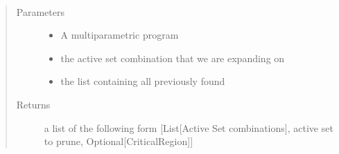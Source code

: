 \documentclass[letterpaper,10pt,english]{sphinxmanual}
\begin{document}
\begin{fulllineitems}
\label{\detokenize{ppopt.mp_solvers:ppopt.mp_solvers.mpqp_parrallel_graph.full_process}}~\begin{quote}\begin{description}
\item[{Parameters}] \leavevmode\begin{itemize}
\item {} 
\sphinxAtStartPar
{} \textendash{} A multiparametric program

\item {} 
\sphinxAtStartPar
{} \textendash{} the active set combination that we are expanding on

\item {} 
\sphinxAtStartPar
{} \textendash{} the list containing all previously found

\end{itemize}

\item[{Returns}] \leavevmode
\sphinxAtStartPar
a list of the following form {[}List{[}Active Set combinations{]}, active set to prune, Optional{[}CriticalRegion{]}{]}

\end{description}\end{quote}

\end{fulllineitems}

\end{document}
